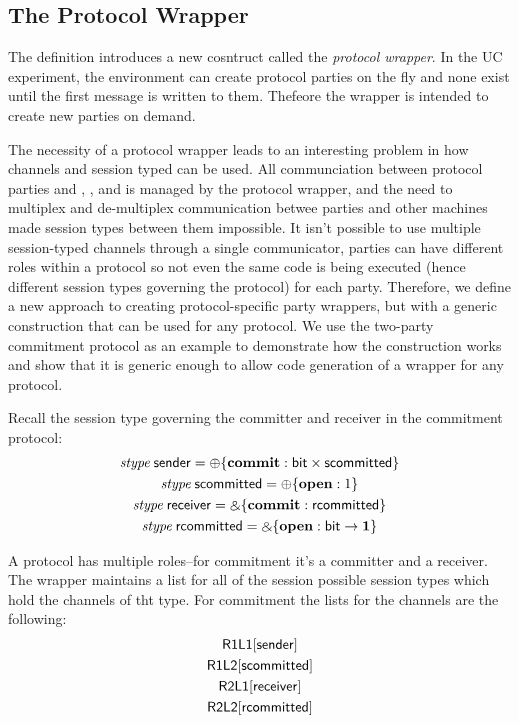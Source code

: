\subsection{The Protocol Wrapper}
The  definition introduces a new cosntruct called the \textit{protocol wrapper}. 
In the UC experiment, the environment can create protocol parties on the fly and none exist until the first message is written to them.
Thefeore the wrapper is intended to create new parties on demand.

The necessity of a protocol wrapper leads to an interesting problem in how channels and session typed can be used.
All communciation between protocol parties and \Environment, \F, and \Adversary is managed by the protocol wrapper, and the need to multiplex and de-multiplex communication betwee parties and other machines made session types between them impossible.
It isn't possible to use multiple session-typed channels through a single communicator, parties can have different roles within a protocol so not even the same code is being executed (hence different session types governing the protocol) for each party.
Therefore, we define a new approach to creating protocol-specific party wrappers, but with a generic construction that can be used for any protocol.
We use the two-party commitment protocol as an example to demonstrate how the construction works and show that it is generic enough to allow code generation of a wrapper for any protocol.


Recall the session type governing the committer and receiver in the commitment protocol:
\begin{gather}
	\mbox{\it stype} \; \mathsf{sender} = \oplus \{ \mathbf{commit} : \mathsf{bit} \times \mathsf{scommitted} \} \\
	\mbox{\it stype} \; \mathsf{scommitted} = \oplus \{ \mathbf{open} : 1 \} \\
	\mbox{\it stype} \; \mathsf{receiver} = \mathbin{\binampersand} \{ \mathbf{commit} : \mathsf{rcommitted} \} \\
	\mbox{\it stype} \; \mathsf{rcommitted} = \mathbin{\binampersand} \{ \mathbf{open} : \mathsf{bit} \rightarrow \mathbf{1} \}
\end{gather}

A protocol has multiple roles--for commitment it's a committer and a receiver.
The wrapper maintains a list for all of the session possible session types which hold the channels of tht type. 
For commitment the lists for the  channels are the following:
\begin{gather}
	\mathsf{R1L1}[\mathsf{sender}] \\
	\mathsf{R1L2}[\mathsf{scommitted}] \\
	\mathsf{R2L1}[\mathsf{receiver}] \\
	\mathsf{R2L2}[\mathsf{rcommitted}] 
\end{gather}

